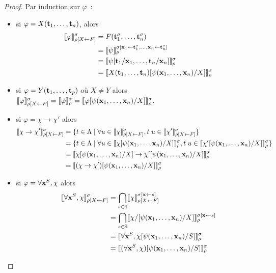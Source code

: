 \documentclass{article}
\begin{document}
\begin{proof}
  Par induction sur $\varphi$~:
  \begin{itemize}
  \item si $\varphi = X(\mathbf{t}_1,\ldots,\mathbf{t}_n)$, alors
    \begin{align*}
      \llbracket \varphi \rrbracket_{\rho[X\leftarrow F]}^\sigma &= F(\mathbf{t}_1^\sigma,\ldots,\mathbf{t}_n^\sigma) \\
      &= \llbracket \psi \rrbracket_\rho^{\sigma[\mathbf{x}_1\leftarrow \mathbf{t}_1^\sigma,\ldots,\mathbf{x}_n\leftarrow \mathbf{t}_n^\sigma]} \\
      &= \llbracket \psi[\mathbf{t}_1/\mathbf{x}_1,\ldots,\mathbf{t}_n/\mathbf{x}_n] \rrbracket_\rho^\sigma\\
      &= \llbracket X(\mathbf{t}_1,\ldots,\mathbf{t}_n)[\psi(\mathbf{x}_1,\ldots,\mathbf{x}_n)/X] \rrbracket_\rho^\sigma
    \end{align*}
  \item si $\varphi = Y(\mathbf{t}_1,\ldots,\mathbf{t}_p)$ où $X\neq Y$ alors $\llbracket \varphi \rrbracket_{\rho[X\leftarrow F]}^\sigma = \llbracket \varphi \rrbracket_\rho^\sigma = \llbracket \varphi[\psi(\mathbf{x}_1,\ldots,\mathbf{x}_n)/X] \rrbracket_\rho^\sigma$.
  \item si $\varphi = \chi \to \chi'$ alors
    \begin{align*}
      \llbracket \chi\to\chi' \rrbracket_{\rho[X\leftarrow F]}^\sigma &= \{t\in\Lambda\mid \forall u \in \llbracket \chi \rrbracket_{\rho[X\leftarrow F]}^\sigma, t\;u\in \llbracket \chi' \rrbracket_{\rho[X\leftarrow F]}^\sigma\}\\
      &= \{t\in\Lambda\mid \forall u \in \llbracket \chi[\psi(\mathbf{x}_1,\ldots,\mathbf{x}_n)/X] \rrbracket_\rho^\sigma, t\;u\in\llbracket \chi'[\psi(\mathbf{x}_1,\ldots,\mathbf{x}_n)/X] \rrbracket_\rho^\sigma\}\\
      &= \llbracket \chi[\psi(\mathbf{x}_1,\ldots,\mathbf{x}_n)/X] \to \chi'[\psi(\mathbf{x}_1,\ldots,\mathbf{x}_n)/X] \rrbracket_\rho^\sigma\\
      &= \llbracket (\chi\to\chi')[\psi(\mathbf{x}_1,\ldots,\mathbf{x}_n)/X] \rrbracket_\rho^\sigma
    \end{align*}
  \item si $\varphi = \forall \mathbf{x}^S, \chi$ alors
    \begin{align*}
      \llbracket \forall \mathbf{x}^S, \chi \rrbracket_{\rho[X\leftarrow F]}^\sigma &= \bigcap_{s\in\mathbb{S}}\llbracket \chi \rrbracket_{\rho[X\leftarrow F]}^{\sigma[\mathbf{x}\leftarrow s]}\\
      &= \bigcap_{s\in\mathbb{S}}\llbracket \chi/[\psi(\mathbf{x}_1,\ldots,\mathbf{x}_n)/X] \rrbracket_\rho^{\sigma[\mathbf{x}\leftarrow s]}\\
      &= \llbracket \forall \mathbf{x}^S, \chi[\psi(\mathbf{x}_1,\ldots,\mathbf{x}_n)/S] \rrbracket_\rho^\sigma\\
      &= \llbracket (\forall \mathbf{x}^S, \chi)[\psi(\mathbf{x}_1,\ldots,\mathbf{x}_n)/S] \rrbracket_\rho^\sigma
    \end{align*}

\end{itemize}
\end{proof}
\end{document}
